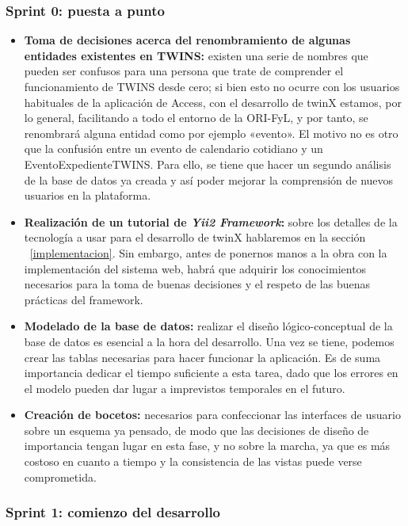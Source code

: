 \subsubsection*{\textbf{Sprint 0: puesta a punto}}

\begin{itemize}
	\item \textbf{Toma de decisiones acerca del renombramiento de algunas entidades existentes en TWINS:} existen una serie de nombres que pueden ser confusos para una persona que trate de comprender el funcionamiento de TWINS desde cero; si bien esto no ocurre con los usuarios habituales de la aplicación de Access\textregistered, con el desarrollo de twinX estamos, por lo general, facilitando a todo el entorno de la ORI-FyL, y por tanto, se renombrará alguna entidad como por ejemplo «evento». El motivo no es otro que la confusión entre un evento de calendario cotidiano y un \gls{EventoExpedienteTWINS}. Para ello, se tiene que hacer un segundo análisis de la base de datos ya creada y así poder mejorar la comprensión de nuevos usuarios en la plataforma.
	\item \textbf{Realización de un tutorial de \textit{Yii2 Framework}:} sobre los detalles de la tecnología a usar para el desarrollo de twinX hablaremos en la sección ~\ref{implementacion}. Sin embargo, antes de ponernos manos a la obra con la implementación del sistema web, habrá que adquirir los conocimientos necesarios para la toma de buenas decisiones y el respeto de las buenas prácticas del framework. %
	\item \textbf{Modelado de la base de datos:} realizar el diseño lógico-conceptual de la base de datos es esencial a la hora del desarrollo. Una vez se tiene, podemos crear las tablas necesarias para hacer funcionar la aplicación. Es de suma importancia dedicar el tiempo suficiente a esta tarea, dado que los  errores en el modelo pueden dar lugar a imprevistos temporales en el futuro.
	\item \textbf{Creación de bocetos:} necesarios para confeccionar las interfaces de usuario sobre un esquema ya pensado, de modo que las decisiones de diseño de importancia tengan lugar en esta fase, y no sobre la marcha, ya que es más costoso en cuanto a tiempo y la consistencia de las vistas puede verse comprometida.	
\end{itemize}


\subsubsection*{\textbf{Sprint 1: comienzo del desarrollo}}

